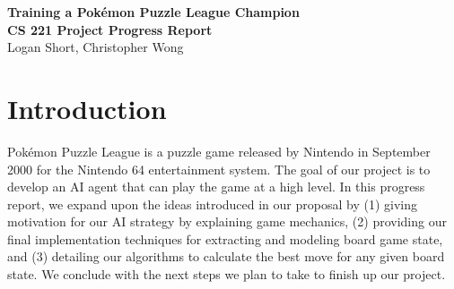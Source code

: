 \documentclass[10pt, final]{article}
\begin{document}
\begin{center}
\LARGE{\textbf{Training a Pok\'{e}mon Puzzle League Champion}}\\
\Large{\textbf{CS 221 Project Progress Report}}\\
\Large{Logan Short, Christopher Wong}
\end{center}

\section{Introduction}
Pok\'{e}mon Puzzle League is a puzzle game released by Nintendo in September 2000 for the Nintendo 64 entertainment system. The goal of our project is to develop an AI agent that can play the game at a high level. In this progress report, we expand upon the ideas introduced in our proposal by (1) giving motivation for our AI strategy by explaining game mechanics, (2) providing our final implementation techniques for extracting and modeling board game state, and (3) detailing our algorithms to calculate the best move for any given board state. We conclude with the next steps we plan to take to finish up our project.
\end{document}
